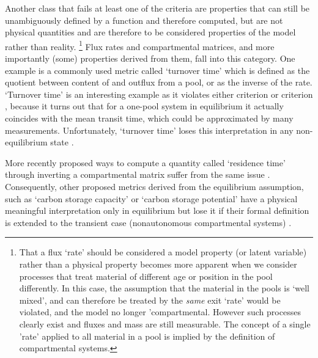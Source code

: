 Another class that fails at least one of the criteria
are properties that can still be unambiguously defined by a function and
therefore computed, but are not physical quantities and are therefore to be
considered properties of the model rather than reality. 
\footnote{
  That a flux `rate' should be considered a model property (or latent variable)
  rather than a physical property becomes more apparent when we consider
  processes that treat material of different age or position in the pool
  differently.  In this case, the assumption that the material in the pools is
  `well mixed', and can therefore be treated by the \emph{same} exit `rate'
  would be violated, and the model no longer 'compartmental.  However such
  processes clearly exist and fluxes and mass are still measurable.  The
  concept of a single 'rate' applied to all material in a pool is implied by
  the definition of compartmental systems.
} 
Flux rates and compartmental matrices, and more importantly (some) properties derived from them, fall into  this category. 
One example is a commonly used metric called `turnover time' which is defined as the quotient between content of and outflux from a pool, or as the inverse of the rate. 
`Turnover time' is an interesting example as it violates either criterion  or criterion  , 
because it turns out that for a one-pool system in equilibrium it actually coincides with the mean transit time,
which could be approximated by many measurements. Unfortunately, `turnover time' loses this interpretation in any non-equilibrium state \citep{Sierra2016GlobChangBiol, Lu2018Biogeosciences}.

More recently proposed ways to compute a quantity called `residence time' through inverting a compartmental matrix \citep{Xia2013GCB, Luo2017Biogeosciences, Luo2022, luo_land_2022} suffer from the same issue \citep{Sierra2016GlobChangBiol}.
Consequently, other proposed metrics derived from the equilibrium assumption, such as `carbon storage capacity' or `carbon storage potential' \citep{Luo2017Biogeosciences, Huang2017GCB, zhou_traceability_2021, LiaoDisentangling2022, Luo2022, luo_land_2022} have a physical meaningful interpretation only in equilibrium but lose it if their formal definition is extended to the transient case (nonautonomous compartmental systems) \citep{Sierra2018JAMES}.

